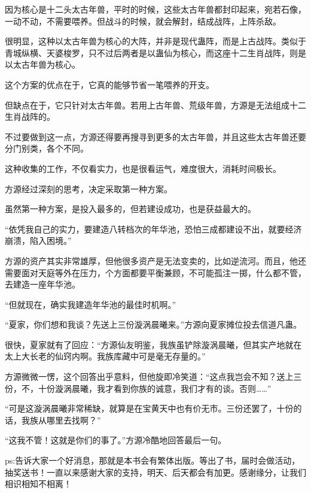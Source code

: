 \begin{this_body}
因为核心是十二头太古年兽，平时的时候，这些太古年兽都封印起来，宛若石像，一动不动，不需要喂养。但战斗的时候，就会解封，结成战阵，上阵杀敌。

很明显，这种以太古年兽为核心的大阵，并非是现代蛊阵，而是上古战阵。类似于青城纵横、天婆梭罗，只不过后两者是以蛊仙为核心，而这座十二生肖战阵，则是以太古年兽为核心。

这个方案的优点在于，它真的能够节省一笔喂养的开支。

但缺点在于，它只针对太古年兽。若用上古年兽、荒级年兽，方源是无法组成十二生肖战阵的。

不过要做到这一点，方源还得要再搜寻到更多的太古年兽，并且这些太古年兽还要分门别类，各个不同。

这种收集的工作，不仅看实力，也是很看运气，难度很大，消耗时间极长。

方源经过深刻的思考，决定采取第一种方案。

虽然第一种方案，是投入最多的，但若建设成功，也是获益最大的。

“依凭我自己的实力，要建造八转档次的年华池，恐怕三成都建设不出，就要经济崩溃，陷入困境。”

方源的资产其实非常雄厚，但他很多资产是无法变卖的，比如逆流河。而且，他还需要面对天庭等外在压力，个方面都要平衡兼顾，不可能孤注一掷，什么都不管，去建造一座年华池。

“但就现在，确实我建造年华池的最佳时机啊。”

“夏家，你们想和我谈？先送上三份漩涡晨曦来。”方源向夏家摊位投去信道凡蛊。

很快，夏家就有了回应：“方源仙友明鉴，我族虽铲除漩涡晨曦，但其实产地就在太上大长老的仙窍内啊。我族库藏中可是毫无存量的。”

方源微微一愣，这个回答出乎意料，但他旋即冷笑道：“这点我岂会不知？送上三份，不，十份漩涡晨曦，我才看到你族的诚意，我们才有的谈。否则……”

“可是这漩涡晨曦非常稀缺，就算是在宝黄天中也有价无市。三份还罢了，十份的话，我族从哪里去找啊？”

“这我不管！这就是你们的事了。”方源冷酷地回答最后一句。

ps:告诉大家一个好消息，那就是本书会有繁体出版。等出了书，届时会做活动，抽奖送书！一直以来感谢大家的支持，明天、后天都会有加更。感谢缘分，让我们相识相知不相离！

\end{this_body}

